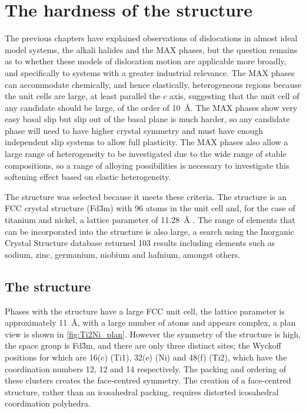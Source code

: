 

\chapter{\texorpdfstring{The hardness of the  structure}{The hardness of the Ti2Ni structure}}
\graphicspath{{hardness_of_ti_2_ni/Figs/}}
\label{chap:ti2ni_hardness}



The previous chapters have explained observations of dislocations in almost ideal model systems, the alkali halides and the MAX phases, but the question remains as to whether these models of dislocation motion are applicable more broadly, and specifically to systems with a greater industrial relevance. The MAX phases can accommodate chemically, and hence elastically, heterogeneous regions because the unit cells are large, at least parallel the $c$ axis, suggesting that the unit cell of any candidate should be large, of the order of \SI{10}{\angstrom}. The MAX phases show very easy basal slip but slip out of the basal plane is much harder, so any candidate phase will need to have higher crystal symmetry and must have enough independent slip systems to allow full plasticity. The MAX phases also allow a large range of heterogeneity to be investigated due to the wide range of stable compositions, so a range of alloying possibilities is necessary to investigate this softening effect based on elastic heterogeneity.

The  structure was selected because it meets these criteria. The structure is an FCC crystal structure (Fd\={3}m) with 96 atoms in the unit cell and, for the case of titanium and nickel, a lattice parameter of \SI{11.28}{\angstrom} \cite{Yurko1959,Yurko1962}. The range of elements that can be incorporated into the structure is also large, a search using the Inorganic Crystal Structure database \cite{ICSD} returned 103 results including elements such as sodium, zinc, germanium, niobium and hafnium, amongst others.

\section{The \texorpdfstring{}{Ti2Ni} structure}
\FloatBarrier


Phases with the  structure have a large FCC unit cell, the lattice parameter is approximately \SI{11}{\angstrom}, with a large number of atoms and appears complex, a plan view is shown in \autoref{fig:Ti2Ni_plan}. However the symmetry of the structure is high, the space group is Fd\={3}m, and there are only three distinct sites; the Wyckoff positions for which are 16(c) (Ti1), 32(e) (Ni) and 48(f) (Ti2), which have the coordination numbers 12, 12 and 14 respectively. The packing and ordering of these clusters creates the face-centred symmetry. The creation of a face-centred structure, rather than an icosahedral packing, requires distorted icosahedral coordination polyhedra.


